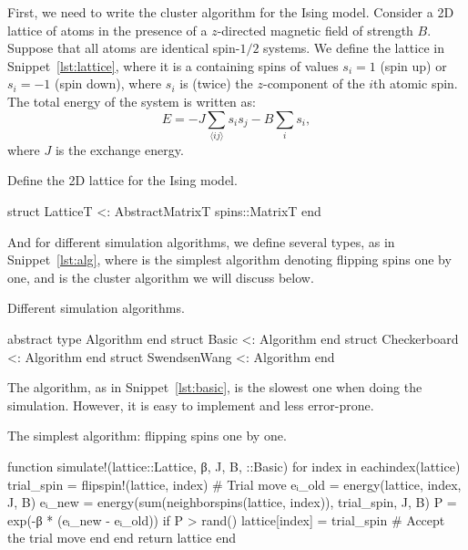First, we need to write the cluster algorithm for the Ising model.
Consider a 2D lattice of atoms in the presence of a \(z\)-directed magnetic field of strength
\(B\). Suppose that all atoms are identical spin-\(1/2\) systems.
We define the lattice in Snippet~\ref{lst:lattice},
where it is a  containing spins of values \(s_i = 1\) (spin up) or
\(s_i = -1\) (spin down), where \(s_i\) is (twice) the \(z\)-component of the \(i\)th
atomic spin. The total energy of the system is written as:
%
\begin{equation}
    E = -J \sum_{\langle i j \rangle} s_i s_j - B \sum_{i} s_i,
\end{equation}
%
where \(J\) is the exchange energy.

%
\begin{algorithm}
    \caption{Define the 2D lattice for the Ising model.}
    \label{lst:lattice}
    \begin{juliacode}
        struct Lattice{T} <: AbstractMatrix{T}
            spins::Matrix{T}
        end
    \end{juliacode}
\end{algorithm}
%
And for different simulation algorithms, we define several types, as in
Snippet~\ref{lst:alg}, where  is the simplest algorithm
denoting flipping spins one by one, and  is the cluster
algorithm we will discuss below.

\begin{algorithm}
    \caption{Different simulation algorithms.}
    \label{lst:alg}
    \begin{juliacode}
        abstract type Algorithm end
        struct Basic <: Algorithm end
        struct Checkerboard <: Algorithm end
        struct SwendsenWang <: Algorithm end
    \end{juliacode}
\end{algorithm}

The  algorithm, as in Snippet~\ref{lst:basic},
is the slowest one when doing the simulation. However, it is easy to implement
and less error-prone.

\begin{algorithm}
    \caption{The simplest algorithm: flipping spins one by one.}
    \label{lst:basic}
    \begin{juliacode}
        function simulate!(lattice::Lattice, β, J, B, ::Basic)
            for index in eachindex(lattice)
                trial_spin = flipspin!(lattice, index)  # Trial move
                eᵢ_old = energy(lattice, index, J, B)
                eᵢ_new = energy(sum(neighborspins(lattice, index)), trial_spin, J, B)
                P = exp(-β * (eᵢ_new - eᵢ_old))
                if P > rand()
                    lattice[index] = trial_spin  # Accept the trial move
                end
            end
            return lattice
        end
    \end{juliacode}
\end{algorithm}

